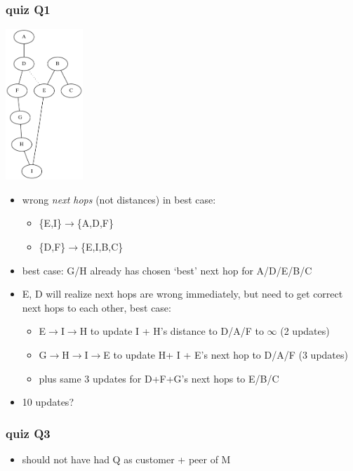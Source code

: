 \begin{frame}
\frametitle{quiz Q1}
\begin{minipage}{3cm}
\includegraphics[width=2.9cm]{quiz-graph}
\end{minipage}
\begin{minipage}{10cm}
\begin{itemize}\small
    \item wrong \textit{next hops} (not distances) in best case:
        \begin{itemize} \small
        \item \{E,I\}$\rightarrow$\{A,D,F\}
        \item \{D,F\}$\rightarrow$\{E,I,B,C\}
        \end{itemize}
    \item best case: G/H already has chosen `best' next hop for A/D/E/B/C
    \item E, D will realize next hops are wrong immediately, but need to get correct
        next hops to each other, best case:
        \begin{itemize} \small
            \item E$\rightarrow$I$\rightarrow$H to update I + H's distance to D/A/F to $\infty$ (2 updates)
            \item G$\rightarrow$H$\rightarrow$I$\rightarrow$E to update H+ I + E's next hop to D/A/F (3 updates)
            \item plus same 3 updates for D+F+G's next hops to E/B/C
        \end{itemize}
    \item 10 updates?
\end{itemize}
\end{minipage}
\end{frame}

\begin{frame}
\frametitle{quiz Q3}
    \begin{itemize}
        \item should not have had Q as customer + peer of M
    \end{itemize}
\end{frame}


